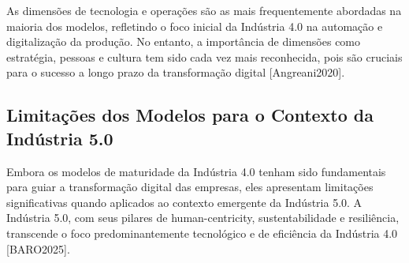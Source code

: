 As dimensões de tecnologia e operações são as mais frequentemente abordadas na maioria dos modelos, refletindo o foco inicial da Indústria 4.0 na automação e digitalização da produção. No entanto, a importância de dimensões como estratégia, pessoas e cultura tem sido cada vez mais reconhecida, pois são cruciais para o sucesso a longo prazo da transformação digital [Angreani2020].

\subsection{Limitações dos Modelos para o Contexto da Indústria 5.0}

Embora os modelos de maturidade da Indústria 4.0 tenham sido fundamentais para guiar a transformação digital das empresas, eles apresentam limitações significativas quando aplicados ao contexto emergente da Indústria 5.0. A Indústria 5.0, com seus pilares de human-centricity, sustentabilidade e resiliência, transcende o foco predominantemente tecnológico e de eficiência da Indústria 4.0 [BARO2025].

